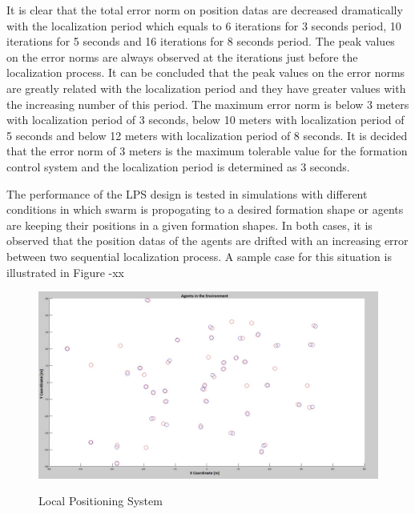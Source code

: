 		
It is clear that the total error norm on position datas are decreased dramatically with the localization period which equals to 6 iterations for 3 seconds period, 10 iterations for 5 seconds and 16 iterations for 8 seconds period. The peak values on the error norms are always observed at the iterations just before the localization process. It can be concluded that the peak values on the error norms are greatly related with the localization period and they have greater values with the increasing number of this period. The maximum error norm is below 3 meters with localization period of 3 seconds, below 10 meters with localization period of 5 seconds and below 12 meters with localization period of 8 seconds. It is decided  that the error norm of 3 meters is the maximum tolerable value for the formation control system and the localization period is determined as 3 seconds. 

The performance of the LPS design is tested in simulations with different conditions in which swarm is propogating to a desired formation shape or agents are keeping their positions in a given formation shapes.  In both cases, it is observed that the position datas of the agents are drifted with an increasing error between two  sequential localization process. A sample case for this situation is illustrated in Figure -xx


		
		\begin{figure}[H]
\caption{Local Positioning System}
\centering
\includegraphics[scale = 0.65]{Pozisyon_1_Hatali}
\label{fig:lps}
\end{figure}


